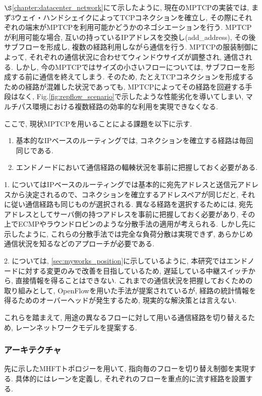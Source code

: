 $\S$\ref{chapter:datacenter_network}にて示したように, 現在のMPTCPの実装では,
まず3ウェイ・ハンドシェイクによってTCPコネクションを確立し, その際にそれぞれの端末がMPTCPを利用可能かどうかのネゴシエーションを行う.
MPTCPが利用可能な場合, 互いの持っているIPアドレスを交換し(add\_address), その後サブフローを形成し, 複数の経路利用しながら通信を行う. 
MPTCPの服装制御によって, それぞれの通信状況に合わせてウィンドウサイズが調整され, 通信される\cite{balia}. 
しかし, 今のMPTCPではサイズの小さいフローについては, サブフローを形成する前に通信を終えてしまう. 
そのため, たとえTCPコネクションを形成するための経路が混雑した状況であっても, MPTCPによってその経路を回避する手段はなく,
Fig.\ref{fig:repflow_scenario}で示したような性能劣化を導いてしまい,
マルチパス環境における複数経路の効率的な利用を実現できなくなる. 

ここで, 現状MPTCPを用いることによる課題を以下に示す. 
\begin{enumerate}
\item 基本的なIPベースのルーティングでは, コネクションを確立する経路は毎回同じである. 
\item エンドノードにおいて通信経路の輻輳状況を事前に把握しておく必要がある. 
\end{enumerate} 
1. についてはIPベースのルーティングでは基本的に宛先アドレスと送信元アドレスから決定されるので、コネクションを確立するアドレスペアが同じだと,
それに従い通信経路も同じものが選択される. 
異なる経路を選択するためには, 宛先アドレスとしてサーバ側の持つアドレスを事前に把握しておく必要があり,
その上でECMPやラウンドロビンのような分散手法の適用が考えられる.
しかし先に示したように, これらの分散手法では完全な負荷分散は実現できず, あらかじめ通信状況を知るなどのアプローチが必要である. 

2. については, \ref{sec:myworks_position}に示しているように, 本研究ではエンドノードに対する変更のみで改善を目指しているため,
遅延している中継スイッチから, 直接情報を得ることはできない. 
これまでの通信状況を把握しておくための取り組みとして, OpenFlowを用いた手法が提案されているが,
経路の統計情報を得るためのオーバーヘッドが発生するため, 現実的な解決策とは言えない\cite{devoflow}.

これらを踏まえて, 用途の異なるフローに対して用いる通信経路を切り替えるため, レーンネットワークモデルを提案する.

\subsubsection{アーキテクチャ}
先に示したMHFTトポロジーを用いて, 指向毎のフローを切り替え制御を実現する. 
具体的にはレーンを定義し, それぞれのフローを重点的に流す経路を設置する. 


